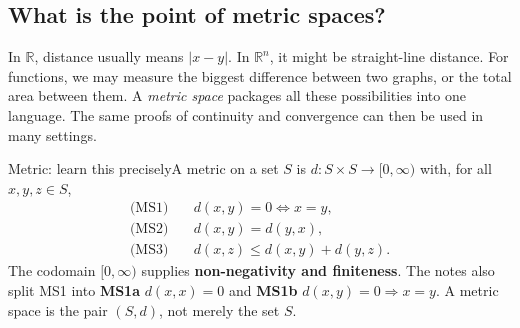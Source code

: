 \documentclass[11pt,a4paper]{article}
\newcommand{\R}{\mathbb R}\newcommand{\N}{\mathbb N}\newcommand{\Z}{\mathbb Z}\newcommand{\Q}{\mathbb Q}\newcommand{\Pow}{\mathcal P}\newcommand{\dd}{\mathrm d}\newcommand{\im}{\operatorname{Ran}}\newcommand{\id}{\operatorname{id}}
\begin{document}
\subsection{What is the point of metric spaces?}
In $\R$, distance usually means $|x-y|$. In $\R^n$, it might be straight-line distance. For functions, we may measure the biggest difference between two graphs, or the total area between them. A \emph{metric space} packages all these possibilities into one language. The same proofs of continuity and convergence can then be used in many settings.
\begin{keybox}{Metric: learn this precisely}A metric on a set $S$ is $d:S\times S\to[0,\infty)$ with, for all $x,y,z\in S$,
\begin{align*} \text{(MS1)}&\quad d(x,y)=0\iff x=y,\\ \text{(MS2)}&\quad d(x,y)=d(y,x),\\ \text{(MS3)}&\quad d(x,z)\le d(x,y)+d(y,z).\end{align*}
The codomain $[0,\infty)$ supplies \textbf{non-negativity and finiteness}. The notes also split MS1 into \textbf{MS1a} $d(x,x)=0$ and \textbf{MS1b} $d(x,y)=0\Rightarrow x=y$. A metric space is the pair $(S,d)$, not merely the set $S$.\end{keybox}
\end{document}
